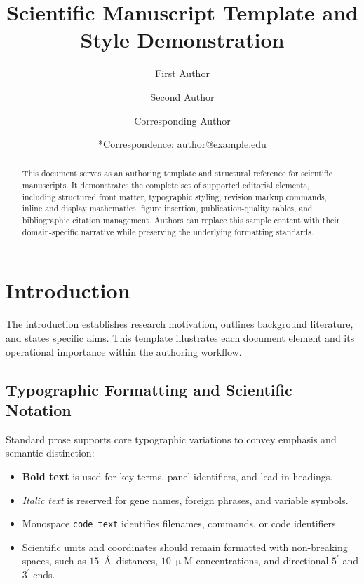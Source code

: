 \documentclass[letterpaper,11pt]{article}
\title{Scientific Manuscript Template and Style Demonstration}
\author[1]{First Author}
\author[2]{Second Author}
\author[1,*]{Corresponding Author}
\affil[1]{Department of Example Studies, Example University, City, Country}
\affil[2]{Institute of Demonstration Research, Example University, City, Country}
\date{*Correspondence: author@example.edu}
\begin{document}
\modulolinenumbers[1]
\linenumbers
\maketitle

\begin{abstract}
This document serves as an authoring template and structural reference for scientific manuscripts. It demonstrates the complete set of supported editorial elements, including structured front matter, typographic styling, revision markup commands, inline and display mathematics, figure insertion, publication-quality tables, and bibliographic citation management. Authors can replace this sample content with their domain-specific narrative while preserving the underlying formatting standards.
\end{abstract}

\section{Introduction}

The introduction establishes research motivation, outlines background literature, and states specific aims. This template illustrates each document element and its operational importance within the authoring workflow.

\subsection{Typographic Formatting and Scientific Notation}
Standard prose supports core typographic variations to convey emphasis and semantic distinction:
\begin{itemize}
  \item \textbf{Bold text} is used for key terms, panel identifiers, and lead-in headings.
  \item \textit{Italic text} is reserved for gene names, foreign phrases, and variable symbols.
  \item Monospace \texttt{code text} identifies filenames, commands, or code identifiers.
  \item Scientific units and coordinates should remain formatted with non-breaking spaces, such as $15$~\AA\ distances, $10~\upmu\text{M}$ concentrations, and directional $5^\prime$ and $3^\prime$ ends.
\end{itemize}
\end{document}

